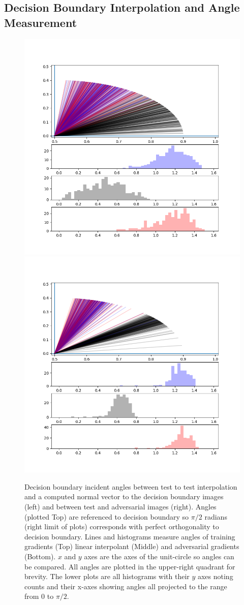 \subsection{Decision Boundary Interpolation and Angle Measurement} \label{subsec:dbe}

\begin{figure}[!ht]
\centering\includegraphics[width=0.50\linewidth, trim=1.5cm 1.5cm 2cm 2cm, clip]{c3_figures/stab-mnist-C32-100-100-10-0.001-200-eval-1e-06-db_interp-angles-1stquadall199.png}\includegraphics[width=0.50\linewidth, trim=1.5cm 1.5cm 2cm 2cm, clip]{c3_figures/stab-mnist-C32-100-100-10-0.001-200-eval-1e-06-attack-db_interp-angles-1stquadall199.png}

\caption{Decision boundary incident angles between test to test
  interpolation and a computed normal vector to the decision boundary
  images (left) and between test and adversarial images
  (right). Angles (plotted Top) are referenced to decision boundary so
  $\pi/2$ radians (right limit of plots) corresponds with perfect
  orthogonality to decision boundary. Lines and histograms measure
  angles of training gradients (Top) linear interpolant (Middle) and
  adversarial gradients (Bottom). $x$ and $y$ axes are the axes of the
  unit-circle so angles can be compared. All angles are plotted in the
upper-right quadrant for brevity. The lower plots are all histograms
with their $y$ axes noting counts and their x-axes showing angles all
projected to the range from 0 to $\pi/2$.}
\label{fig:dba}
\end{figure}

